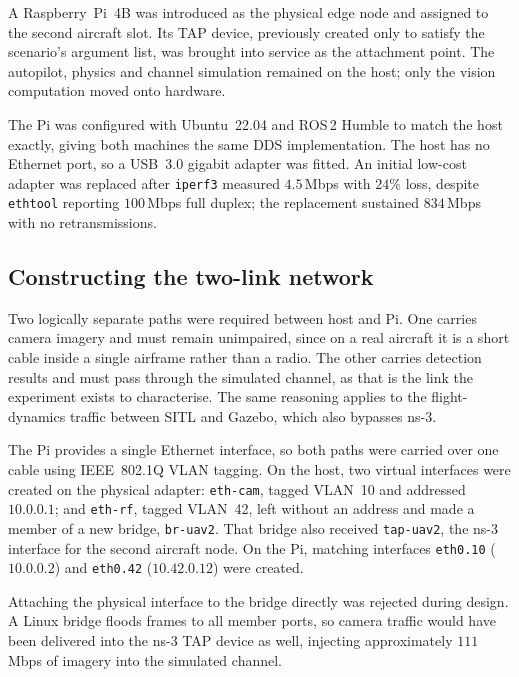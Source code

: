 A Raspberry~Pi~4B was introduced as the physical edge node and assigned to the
second aircraft slot. Its TAP device, previously created only to satisfy the
scenario's argument list, was brought into service as the attachment point. The
autopilot, physics and channel simulation remained on the host; only the vision
computation moved onto hardware.

The Pi was configured with Ubuntu~22.04 and ROS\,2 Humble to match the host
exactly, giving both machines the same DDS implementation. The host has no
Ethernet port, so a USB~3.0 gigabit adapter was fitted. An initial low-cost
adapter was replaced after \texttt{iperf3} measured \(4.5\)\,Mbps with \(24\%\)
loss, despite \texttt{ethtool} reporting \(100\)\,Mbps full duplex; the
replacement sustained \(834\)\,Mbps with no retransmissions.

\subsection{Constructing the two-link network}
\label{sec:hitl-network}

Two logically separate paths were required between host and Pi. One carries
camera imagery and must remain unimpaired, since on a real aircraft it is a short
cable inside a single airframe rather than a radio. The other carries detection
results and must pass through the simulated channel, as that is the link the
experiment exists to characterise. The same reasoning applies to the
flight-dynamics traffic between SITL and Gazebo, which also bypasses ns-3.

The Pi provides a single Ethernet interface, so both paths were carried over one
cable using IEEE~802.1Q VLAN tagging. On the host, two virtual interfaces were
created on the physical adapter: \texttt{eth-cam}, tagged VLAN~10 and addressed
\(10.0.0.1\); and \texttt{eth-rf}, tagged VLAN~42, left without an address and
made a member of a new bridge, \texttt{br-uav2}. That bridge also received
\texttt{tap-uav2}, the ns-3 interface for the second aircraft node. On the Pi,
matching interfaces \texttt{eth0.10} (\(10.0.0.2\)) and \texttt{eth0.42}
(\(10.42.0.12\)) were created.

Attaching the physical interface to the bridge directly was rejected during
design. A Linux bridge floods frames to all member ports, so camera traffic would
have been delivered into the ns-3 TAP device as well, injecting approximately
\(111\)\,Mbps of imagery into the simulated channel.

